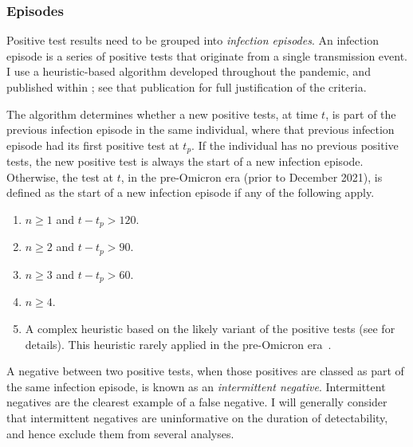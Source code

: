 \documentclass[thesis.tex]{subfiles}
\begin{document}
\subsubsection{Episodes}

Positive test results need to be grouped into \emph{infection episodes}.
An infection episode is a series of positive tests that originate from a single transmission event.
I use a heuristic-based algorithm developed throughout the pandemic, and published within \textcite{weiRisk}; see that publication for full justification of the criteria.

The algorithm determines whether a new positive tests, at time $t$, is part of the previous infection episode in the same individual, where that previous infection episode had its first positive test at $t_p$.
If the individual has no previous positive tests, the new positive test is always the start of a new infection episode.
Otherwise, the test at $t$, in the pre-Omicron era (prior to December 2021), is defined as the start of a new infection episode if any of the following apply.
\begin{enumerate}
  \item $n \geq 1$ and $t - t_p > 120$.
  \item $n \geq 2$ and $t - t_p > 90$.
  \item $n \geq 3$ and $t - t_p > 60$.
  \item $n \geq 4$.
  \item A complex heuristic based on the likely variant of the positive tests (see \textcite{weiRisk} for details). This heuristic rarely applied in the pre-Omicron era~.
\end{enumerate}

A negative between two positive tests, when those positives are classed as part of the same infection episode, is known as an \emph{intermittent negative}.
Intermittent negatives are the clearest example of a false negative.
I will generally consider that intermittent negatives are uninformative on the duration of detectability, and hence exclude them from several analyses.
\end{document}
